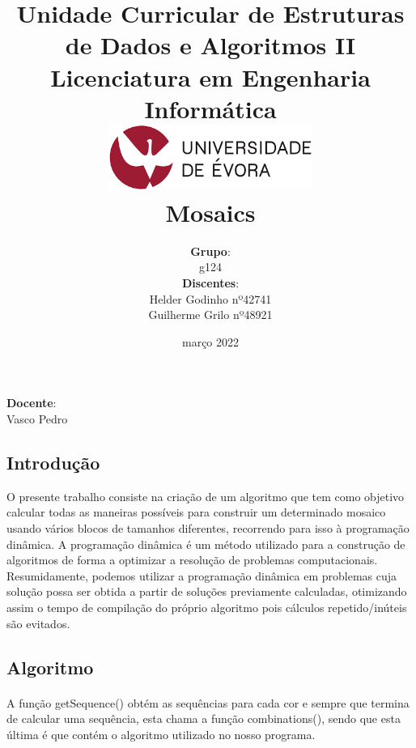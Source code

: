 \documentclass[12pt]{article}
\title {
{\large Unidade Curricular de Estruturas de Dados e Algoritmos II 
\\ Licenciatura em Engenharia Informática}
\\ \vspace{2 cm}
\includegraphics[width=0.5\textwidth]{ue}
\\[1 cm]\textbf{\Huge Mosaics}\vspace{1 cm}
}
\author {
\normalsize \textbf{Grupo}:\\ \normalsize g124
\vspace{0.3 cm}
\\ \normalsize \textbf{Discentes}:\\ \normalsize Helder Godinho nº42741\\ \normalsize Guilherme Grilo nº48921
}
\date{\normalsize março 2022}
\begin{document}
\maketitle
\vspace{1.5 cm}
\begin{center}
\normalsize \textbf{Docente}: \\ \normalsize Vasco Pedro
\end{center}
\thispagestyle{empty}
\newpage
\setcounter{page}{1}
 \renewcommand{\contentsname}{\begin{center}
 \LARGE Índice
 \end{center}}



\tableofcontents

\newpage
\begin{center}
\section{Introdução}
\end{center}
O presente trabalho consiste na criação de um algoritmo que tem como objetivo calcular todas as maneiras possíveis para construir um determinado mosaico usando vários blocos de tamanhos diferentes, recorrendo para isso à programação dinâmica.
A programação dinâmica é um método utilizado para a construção de algoritmos de forma a optimizar a resolução de problemas computacionais. Resumidamente, podemos utilizar a programação dinâmica em problemas cuja solução possa ser obtida a partir de soluções previamente calculadas, otimizando assim o tempo de compilação do próprio algoritmo pois cálculos repetido/inúteis são evitados.

\newpage
\begin{center}
\section{Algoritmo}
\end{center}
\paragraph{}
A função getSequence() obtém as sequências para cada cor e sempre que termina de calcular uma sequência, esta chama a função combinations(), sendo que esta última é que contém o algoritmo utilizado no nosso programa.
\end{document}
